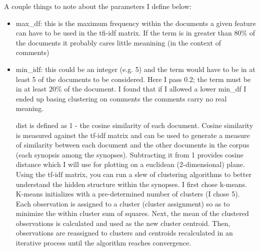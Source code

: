 \documentclass[]{article}
\begin{document}
A couple things to note about the parameters I define below:
\begin{itemize}
\item max\_df: this is the maximum frequency within the documents a given feature can have to be used in the tfi-idf matrix. If the term is in greater than 80\% of the documents it probably cares little meanining (in the context of comments)
\item min\_idf: this could be an integer (e.g. 5) and the term would have to be in at least 5 of the documents to be considered. Here I pass 0.2; the term must be in at least 20\% of the document. I found that if I allowed a lower min\_df I ended up basing clustering on comments the comments carry no real meaning.

dist is defined as 1 - the cosine similarity of each document. Cosine similarity is measured against the tf-idf matrix and can be used to generate a measure of similarity between each document and the other documents in the corpus (each synopsis among the synopses). Subtracting it from 1 provides cosine distance which I will use for plotting on a euclidean (2-dimensional) plane. Using the tf-idf matrix, you can run a slew of clustering algorithms to better understand the hidden structure within the synopses. I first chose k-means. K-means initializes with a pre-determined number of clusters (I chose 5). Each observation is assigned to a cluster (cluster assignment) so as to minimize the within cluster sum of squares. Next, the mean of the clustered observations is calculated and used as the new cluster centroid. Then, observations are reassigned to clusters and centroids recalculated in an iterative process until the algorithm reaches convergence.

\end{itemize}
\end{document}
